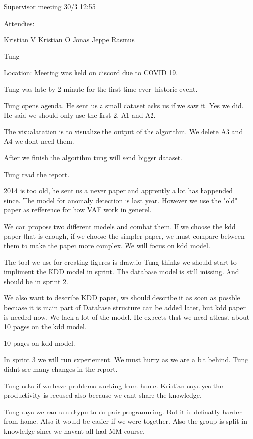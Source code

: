 Supervisor meeting 30/3 12:55

Attendies:

Kristian V
Kristian O
Jonas
Jeppe
Rasmus

Tung

Location: Meeting was held on discord due to COVID 19.

Tung was late by 2 minute for the first time ever, historic event.

Tung opens agenda. He sent us a small dataset asks us if we saw it. Yes we did. He said we should only use the first 2. A1 and A2.

The visualatation is to visualize the output of the algorithm. We delete A3 and A4 we dont need them.

After we finish the algortihm tung will send bigger dataset.

Tung read the report.

2014  is too old, he sent us a never paper and apprently a lot has happended since. The model for anomaly detection is last year. However we use the "old" paper as refference for how VAE work in generel.

We can propose two different models and combat them. If we choose the kdd paper that is enough, if we choose the simpler paper, we must compare between them to make the paper more complex. We will focus on kdd model.

The tool we use for creating figures is draw.io
Tung thinks we should start to impliment the KDD model in sprint.
The database model is still missing. And should be in sprint 2.

We also want to describe KDD paper, we should describe it as soon as possble becuase it is main part of Database structure can be added later, but kdd paper is needed now.
We lack a lot of the model. He expects that we need atleast about 10 pages on the kdd model.

10 pages on kdd model.

In sprint 3 we will run experiement. We must hurry as we are a bit behind. Tung didnt see many changes in the report. 

Tung asks if we have problems working from home. Kristian says yes the productivity is recused also because we cant share the knowledge.

Tung says we can use skype to do pair programming. But it is definatly harder from home. Also it would be easier if we were together. Also the group is split in knowledge since we havent all had MM course.

